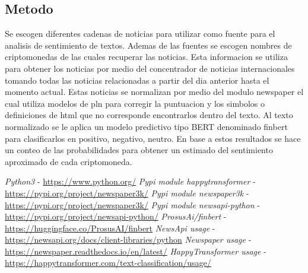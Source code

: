 \documentclass[12pt,jou]{apa7}
\begin{document}
\subsection{Metodo}\label{subsec:metodo}
Se escogen diferentes cadenas de noticias para utilizar como fuente
para el analisis de sentimiento de textos.
Ademas de las fuentes se escogen nombres de criptomonedas de las cuales
recuperar las noticias.
Esta informacion se utiliza para obtener los noticias por medio
del concentrador de noticias internacionales\cite{cite_06} tomando todas las noticias
relacionadas a partir del dia anterior hasta el momento actual.
Estas noticias se normalizan por medio del modulo newspaper\cite{cite_07} el cual utiliza
modelos de pln para corregir la puntuacion y los simbolos o definiciones de html
que no corresponde encontrarlos dentro del texto.
Al texto normalizado se le aplica un modelo predictivo tipo BERT\cite{cite_08}
denominado finbert para clasificarlos en positivo, negativo, neutro.
En base a estos resultados se hace un conteo de las probabilidades para
obtener un estimado del sentimiento aproximado de cada criptomoneda.
\pagebreak
\begin{thebibliography}{99}
 \emph{Python3} - \url{https://www.python.org/}
 \emph{Pypi module happytransformer} - \url{https://pypi.org/project/newspaper3k/}
 \emph{Pypi module newspaper3k} - \url{https://pypi.org/project/newspaper3k/}
 \emph{Pypi module newsapi-python} - \url{https://pypi.org/project/newsapi-python/}
 \emph{ProsusAi/finbert} - \url{https://huggingface.co/ProsusAI/finbert}
 \emph{NewsApi usage} - \url{https://newsapi.org/docs/client-libraries/python}
 \emph{Newspaper usage} - \url{https://newspaper.readthedocs.io/en/latest/}
 \emph{HappyTransformer usage} - \url{https://happytransformer.com/text-classification/usage/}
\end{thebibliography}
\end{document}
